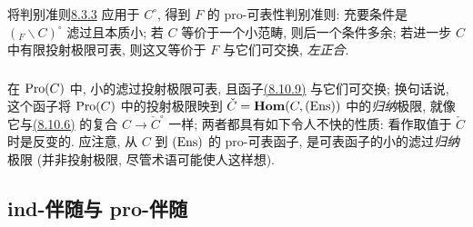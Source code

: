 \setcounter{subsubsection}{13}
\subsubsection{}
将判别准则\hyperref[I.them8.3.3]{8.3.3} 应用于 $C^\circ$,
得到 $F$ 的 pro-可表性判别准则:
充要条件是 $({}_F\backslash C)^\circ$ 滤过且本质小;
若 $C$ 等价于一个小范畴, 则后一个条件多余;
若进一步 $C$ 中有限投射极限可表,
则这又等价于 $F$ 与它们可交换, \ie \emph{左正合}.

\subsubsection{}
在 $\operatorname{Pro}(C)$ 中, 小的滤过投射极限可表,
且函子\hyperlink{sga4.exp.I.equation.8.10.9}{(8.10.9)} 与它们可交换;
换句话说, 这个函子将 $\operatorname{Pro}(C)$ 中的投射极限映到 $\check{C}=\operatorname{\mathbf{Hom}}(C,(\operatorname{Ens}))$
中的\emph{归纳}极限, 就像它与\hyperlink{sga4.exp.I.equation.8.10.6}{(8.10.6)}
的复合 $C\rightarrow\check{C}^\circ$ 一样;
两者都具有如下令人不快的性质: 看作取值于 $\check{C}$ 时是反变的.
应注意, 从 $C$ 到 $(\operatorname{Ens})$ 的 pro-可表\pageoriginale 函子,
是可表函子的小的滤过\emph{归纳}极限
(并非投射极限, 尽管术语可能使人这样想).




\subsection{ind-伴随与 pro-伴随}

